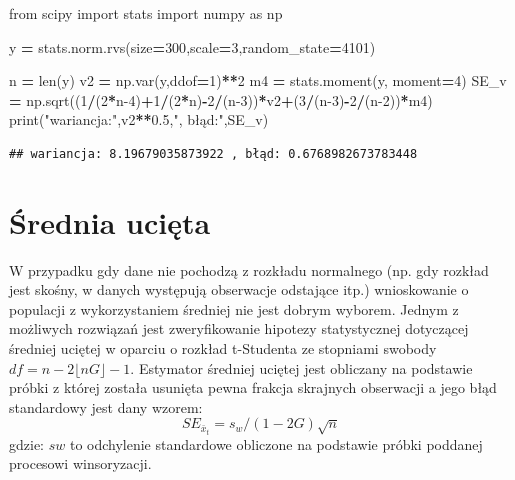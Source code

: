 \documentclass[polish,]{book}
\newenvironment{Shaded}{\begin{snugshade}}{\end{snugshade}}
\newcommand{\BuiltInTok}[1]{#1}
\newcommand{\DecValTok}[1]{\textcolor[rgb]{0.00,0.00,0.81}{#1}}
\newcommand{\FloatTok}[1]{\textcolor[rgb]{0.00,0.00,0.81}{#1}}
\newcommand{\ImportTok}[1]{#1}
\newcommand{\NormalTok}[1]{#1}
\newcommand{\OperatorTok}[1]{\textcolor[rgb]{0.81,0.36,0.00}{\textbf{#1}}}
\newcommand{\StringTok}[1]{\textcolor[rgb]{0.31,0.60,0.02}{#1}}
\begin{document}
\begin{Shaded}
\begin{Highlighting}[]
\ImportTok{from}\NormalTok{ scipy }\ImportTok{import}\NormalTok{ stats}
\ImportTok{import}\NormalTok{ numpy }\ImportTok{as}\NormalTok{ np}

\NormalTok{y }\OperatorTok{=}\NormalTok{ stats.norm.rvs(size}\OperatorTok{=}\DecValTok{300}\NormalTok{,scale}\OperatorTok{=}\DecValTok{3}\NormalTok{,random_state}\OperatorTok{=}\DecValTok{4101}\NormalTok{)}

\NormalTok{n }\OperatorTok{=} \BuiltInTok{len}\NormalTok{(y)}
\NormalTok{v2 }\OperatorTok{=}\NormalTok{ np.var(y,ddof}\OperatorTok{=}\DecValTok{1}\NormalTok{)}\OperatorTok{**}\DecValTok{2}
\NormalTok{m4 }\OperatorTok{=}\NormalTok{ stats.moment(y, moment}\OperatorTok{=}\DecValTok{4}\NormalTok{)}
\NormalTok{SE_v }\OperatorTok{=}\NormalTok{ np.sqrt((}\DecValTok{1}\OperatorTok{/}\NormalTok{(}\DecValTok{2}\OperatorTok{*}\NormalTok{n}\DecValTok{-4}\NormalTok{)}\OperatorTok{+}\DecValTok{1}\OperatorTok{/}\NormalTok{(}\DecValTok{2}\OperatorTok{*}\NormalTok{n)}\OperatorTok{-}\DecValTok{2}\OperatorTok{/}\NormalTok{(n}\DecValTok{-3}\NormalTok{))}\OperatorTok{*}\NormalTok{v2}\OperatorTok{+}\NormalTok{(}\DecValTok{3}\OperatorTok{/}\NormalTok{(n}\DecValTok{-3}\NormalTok{)}\OperatorTok{-}\DecValTok{2}\OperatorTok{/}\NormalTok{(n}\DecValTok{-2}\NormalTok{))}\OperatorTok{*}\NormalTok{m4)}
\BuiltInTok{print}\NormalTok{(}\StringTok{"wariancja:"}\NormalTok{,v2}\OperatorTok{**}\FloatTok{0.5}\NormalTok{,}\StringTok{", błąd:"}\NormalTok{,SE_v)}
\end{Highlighting}
\end{Shaded}

\begin{verbatim}
## wariancja: 8.19679035873922 , błąd: 0.6768982673783448
\end{verbatim}

\hypertarget{R75}{%
\section{Średnia ucięta}\label{R75}}

W przypadku gdy dane nie pochodzą z rozkładu normalnego (np. gdy rozkład jest skośny, w danych występują obserwacje odstające itp.) wnioskowanie o populacji z wykorzystaniem średniej nie jest dobrym wyborem. Jednym z możliwych rozwiązań jest zweryfikowanie hipotezy statystycznej dotyczącej średniej uciętej \citep{tmc1963} w oparciu o rozkład t-Studenta ze stopniami swobody \(df=n-2\lfloor n G \rfloor -1\). Estymator średniej uciętej jest obliczany na podstawie próbki z której została usunięta pewna frakcja skrajnych obserwacji a jego błąd standardowy jest dany wzorem:
\begin{equation}
SE_{\bar{x}_t}=s_w/(1-2G)\sqrt{n}
\label{eq:se10}
\end{equation}
gdzie: \(sw\) to odchylenie standardowe obliczone na podstawie próbki poddanej procesowi winsoryzacji.
\end{document}
